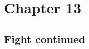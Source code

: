 \documentclass{article}[12px] %
\begin{document}
\section* {Chapter 13}        %
\subsection* {Fight continued}%
\end{document}
